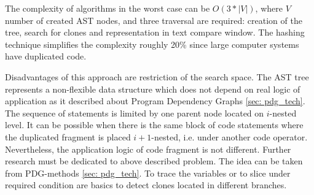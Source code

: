 \documentclass{report}
\begin{document}
The complexity of algorithms in the worst case can be $O(3*|V|)$, where $V$ number of created AST nodes, and three traversal are required: creation of the tree, search for clones and representation in text compare window. The hashing technique simplifies the complexity roughly 20\% since large computer systems have duplicated code.

Disadvantages of this approach are restriction of the search space. The AST tree represents a non-flexible data structure which does not depend on real logic of application as it described about Program Dependency Graphs \ref{sec: pdg_tech}. The sequence of statements is limited by one parent node located on $i$-nested level. It can be possible when there is the same block of code statements where the duplicated fragment is placed $i+1$-nested, i.e. under another code operator. Nevertheless, the application logic  of code fragment is not different. Further research must be dedicated to above described problem. The idea can be taken from PDG-methods \ref{sec: pdg_tech}. To trace the variables or to slice under required condition are basics to detect clones located in different branches.
\end{document}
